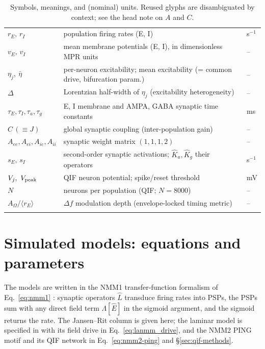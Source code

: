 \documentclass[11pt,a4paper]{article}
\begin{document}
{\begin{longtable}{@{}>{\raggedright\arraybackslash}p{} >{\raggedright\arraybackslash}p{} >{\raggedright\arraybackslash}p{}@{}}
$r_E,\,r_I$ & population firing rates (E, I) & s$^{-1}$ \\
$v_E,\,v_I$ & mean membrane potentials (E, I), in dimensionless MPR units & -- \\
$\eta_j,\ \bar\eta$ & per-neuron excitability; mean excitability (= common drive, bifurcation param.) & -- \\
$\Delta$ & Lorentzian half-width of $\eta_j$ (excitability heterogeneity) & -- \\
$\tau_E,\tau_I,\tau_a,\tau_g$ & E, I membrane and AMPA, GABA synaptic time constants & ms \\
$C\,(\equiv J)$ & global synaptic coupling (inter-population gain) & -- \\
$A_{ee},A_{ei},A_{ie},A_{ii}$ & synaptic weight matrix $(1,1,1,2)$ & -- \\
$s_E,\,s_I$ & second-order synaptic activations; $\hat K_a,\hat K_g$ their operators & s$^{-1}$ \\
$V_j,\ V_{\rm peak}$ & QIF neuron potential; spike/reset threshold & mV \\
$N$ & neurons per population (QIF; $N=8000$) & -- \\
$A_\Omega/\langle r_E\rangle$ & $\Delta f$ modulation depth (envelope-locked timing metric) & -- \\
\bottomrule
\caption{Symbols, meanings, and (nominal) units. Reused glyphs are disambiguated by
context; see the head note on $A$ and $C$.}\label{tab:notation}
\end{longtable}}

\section{Simulated models: equations and parameters}\label{app:models}
The models are written in the NMM1 transfer-function formalism of Eq.~\eqref{eq:nmm1}
\cite{ruffini2025rosetta}: synaptic operators $\hat L$ transduce firing rates into PSPs, the
PSPs sum with any direct field term $\Lambda[\hat E]$ in the sigmoid argument, and the sigmoid
returns the rate. The Jansen--Rit column is given here; the laminar model is specified in
\cite{ruffini2025cfc,sanchezTodo2023} with its field drive in Eq.~\eqref{eq:lanmm_drive}, and
the NMM2 PING motif and its QIF network in Eq.~\eqref{eq:nmm2-ping} and \S\ref{sec:qif-methods}.
\end{document}
